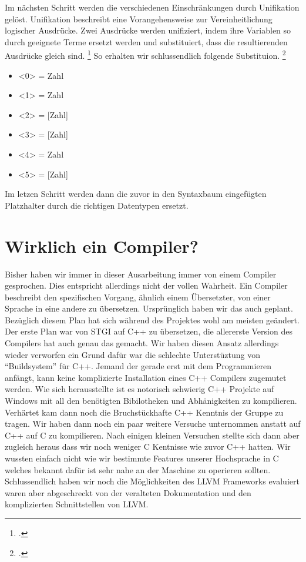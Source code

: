 \documentclass[a4paper, 12pt]{article}
\begin{document}
\pagebreak
Im n\"achsten Schritt werden die verschiedenen Einschr\"ankungen durch Unifikation gel\"ost. Unifikation beschreibt eine Vorangehensweise zur Vereinheitlichung logischer Ausdrücke. Zwei Ausdrücke werden unifiziert, indem ihre Variablen
so durch geeignete Terme ersetzt werden und substituiert, dass die resultierenden Ausdrücke gleich sind. \footcite{unidef} So erhalten wir schlussendlich folgende Substituion. \footcite{tbe}
\begin{itemize}
  \item{<0> = Zahl}
  \item{<1> = Zahl}
  \item{<2> = [Zahl]}
  \item{<3> = [Zahl]}
  \item{<4> = Zahl}
  \item{<5> = [Zahl]}
\end{itemize}
Im letzen Schritt werden dann die zuvor in den Syntaxbaum eingef\"ugten
Platzhalter durch die richtigen Datentypen ersetzt.


\section{Wirklich ein Compiler?}
Bisher haben wir immer in dieser Ausarbeitung immer von einem Compiler
gesprochen. Dies entspricht allerdings nicht der vollen Wahrheit. Ein Compiler beschreibt den spezifischen Vorgang, \"ahnlich einem \"Ubersetzter, von
einer Sprache in eine andere zu \"ubersetzen. Urspr\"unglich haben wir das
auch geplant. Bez\"uglich diesem Plan hat sich w\"ahrend des Projektes wohl
am meisten ge\"andert. Der erste Plan war von STGI auf C++ zu \"ubersetzen, die allererste Version des Compilers hat auch genau das gemacht. Wir
haben diesen Ansatz allerdings wieder verworfen ein Grund daf\"ur war die
schlechte Unterst\"uztung von “Buildsystem” f\"ur C++. Jemand der gerade
erst mit dem Programmieren anf\"angt, kann keine komplizierte Installation eines C++ Compilers zugemutet werden. Wie sich herausstellte ist es notorisch
schwierig C++ Projekte auf Windows mit all den ben\"otigten Bibilotheken
und Abh\"anigkeiten zu kompilieren. Verh\"artet kam dann noch die Bruchst\"uckhafte C++ Kenntnis der Gruppe zu tragen. Wir haben dann noch ein paar
weitere Versuche unternommen anstatt auf C++ auf C zu kompilieren. Nach
einigen kleinen Versuchen stellte sich dann aber zugleich heraus dass wir noch
weniger C Kentnisse wie zuvor C++ hatten. Wir wussten einfach nicht wie
wir bestimmte Features unserer Hochsprache in C welches bekannt daf\"ur ist
sehr nahe an der Maschine zu operieren sollten.
Schlussendlich haben wir noch die M\"oglichkeiten des LLVM Frameworks evaluiert waren aber abgeschreckt von der veralteten Dokumentation und den
komplizierten Schnittstellen von LLVM.
\end{document}
